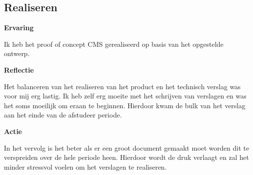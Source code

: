 \subsection{Realiseren}
\textbf{Ervaring}

\whitespace
Ik heb het proof of concept \gls{CMS} gerealiseerd op basis van het opgestelde ontwerp.

\newpage

\whitespace
\textbf{Reflectie}

\whitespace
Het balanceren van het realiseren van het product en het technisch verslag was voor mij erg lastig.
Ik heb zelf erg moeite met het schrijven van verslagen en was het soms moeilijk om eraan te beginnen.
Hierdoor kwam de bulk van het verslag aan het einde van de afstudeer periode.

\whitespace
\textbf{Actie}

\whitespace
In het vervolg is het beter als er een groot document gemaakt moet worden dit te verspreiden over de hele periode heen.
Hierdoor wordt de druk verlaagt en zal het minder stressvol voelen om het verslagen te realiseren.
